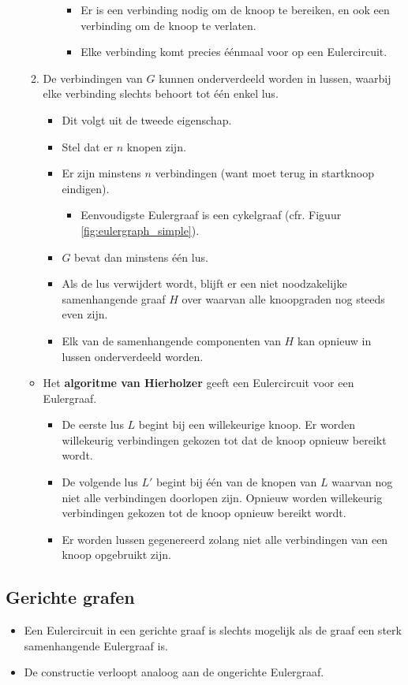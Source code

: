 \begin{itemize}
\begin{enumerate}
\begin{itemize}
\begin{itemize}
				\item Er is een verbinding nodig om de knoop te bereiken, en ook een verbinding om de knoop te verlaten.
				\item Elke verbinding komt precies éénmaal voor op een Eulercircuit.
			\end{itemize}
		\end{itemize}
		\item De verbindingen van $G$ kunnen onderverdeeld worden in lussen, waarbij elke verbinding slechts behoort tot één enkel lus.
		\begin{itemize}
			\item Dit volgt uit de tweede eigenschap.
			\item Stel dat er $n$ knopen zijn.
			\item Er zijn minstens $n$ verbindingen (want moet terug in startknoop eindigen).
			\begin{itemize}
				\item Eenvoudigste Eulergraaf is een cykelgraaf (cfr. Figuur \ref{fig:eulergraph_simple}).
			\end{itemize}
			\item $G$ bevat dan minstens één lus.
			\item Als de lus verwijdert wordt, blijft er een niet noodzakelijke samenhangende graaf $H$ over waarvan alle knoopgraden nog steeds even zijn.
			\item Elk van de samenhangende componenten van $H$ kan opnieuw in lussen onderverdeeld worden.
		\end{itemize}
	\end{enumerate}
	\begin{itemize}
		\item Het \textbf{algoritme van Hierholzer} geeft een Eulercircuit voor een Eulergraaf.
		\begin{itemize}
			\item De eerste lus $L$ begint bij een willekeurige knoop. Er worden willekeurig verbindingen gekozen tot dat de knoop opnieuw bereikt wordt.
			\item De volgende lus $L'$ begint bij één van de knopen van $L$ waarvan nog niet alle verbindingen doorlopen zijn. Opnieuw worden willekeurig verbindingen gekozen tot de knoop opnieuw bereikt wordt.
			\item Er worden lussen gegenereerd zolang niet alle verbindingen van een knoop opgebruikt zijn.
		\end{itemize}
	\end{itemize}
\end{itemize}



\subsection{Gerichte grafen}
\begin{itemize}
	\item Een Eulercircuit in een gerichte graaf is slechts mogelijk als de graaf een sterk samenhangende Eulergraaf is.
	\item De constructie verloopt analoog aan de ongerichte Eulergraaf.
\end{itemize}